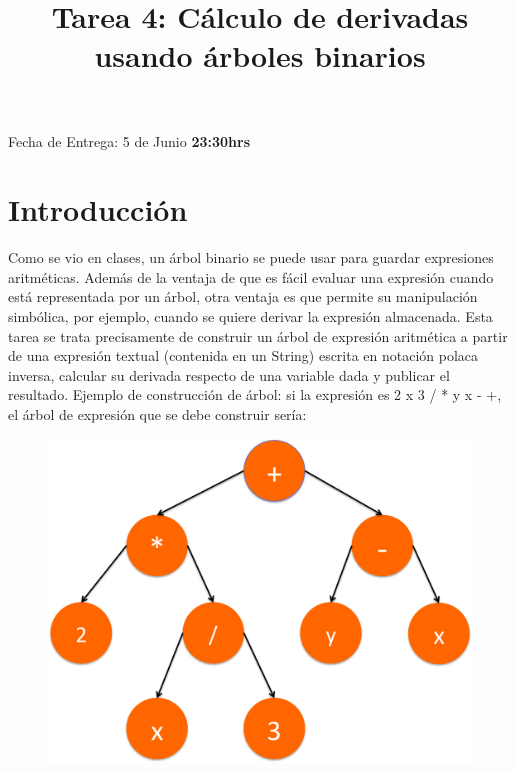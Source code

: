 \documentclass[dcc]{fcfmcourse}
\title{Tarea 4: Cálculo de derivadas usando árboles binarios}
\begin{document}
\maketitle
\vspace{-2ex}
\begin{center}
Fecha de Entrega: 5 de Junio  \textbf{23:30hrs} \\
\end{center}


\section{Introducción}
Como se vio en clases, un árbol binario se puede usar para guardar expresiones aritméticas. Además de la ventaja de que es fácil evaluar una expresión cuando está representada por un árbol, otra ventaja es que permite su manipulación simbólica, por ejemplo, cuando se quiere derivar la expresión almacenada. 
\newline\newline
Esta tarea se trata precisamente de construir un árbol de expresión aritmética a partir de una expresión textual (contenida en un String) escrita en notación polaca inversa, calcular su derivada respecto de una variable dada y publicar el resultado.
\newline\newline
Ejemplo de construcción de árbol: si la expresión es 2 x 3 / * y x - +, el árbol de expresión que se debe construir sería:

\begin{figure}[!h]
    \centering
    \includegraphics[scale=0.45]{imagenes/arbolDerivadas.png}
\end{figure}
\end{document}
